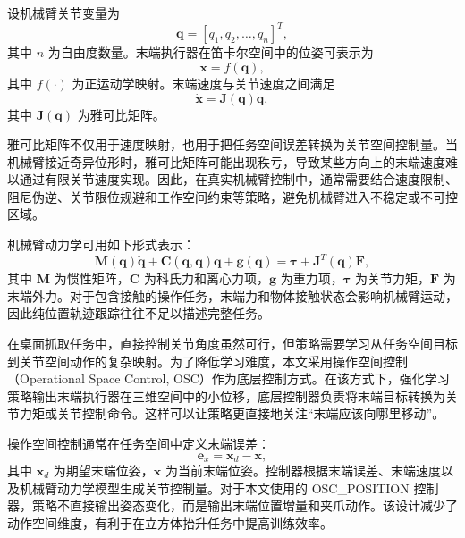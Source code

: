 \documentclass[
    type = bachelor,
    oneside,
    fontset = fandol
]{njuthesis}
\begin{document}
设机械臂关节变量为
\begin{equation}
  \boldsymbol{q} = [q_1, q_2, \dots, q_n]^T,
\end{equation}
其中 $n$ 为自由度数量。末端执行器在笛卡尔空间中的位姿可表示为
\begin{equation}
  \boldsymbol{x} = f(\boldsymbol{q}),
\end{equation}
其中 $f(\cdot)$ 为正运动学映射。末端速度与关节速度之间满足
\begin{equation}
  \dot{\boldsymbol{x}} = \boldsymbol{J}(\boldsymbol{q})\dot{\boldsymbol{q}},
\end{equation}
其中 $\boldsymbol{J}(\boldsymbol{q})$ 为雅可比矩阵。

雅可比矩阵不仅用于速度映射，也用于把任务空间误差转换为关节空间控制量。当机械臂接近奇异位形时，雅可比矩阵可能出现秩亏，导致某些方向上的末端速度难以通过有限关节速度实现。因此，在真实机械臂控制中，通常需要结合速度限制、阻尼伪逆、关节限位规避和工作空间约束等策略，避免机械臂进入不稳定或不可控区域。

机械臂动力学可用如下形式表示：
\begin{equation}
  \boldsymbol{M}(\boldsymbol{q})\ddot{\boldsymbol{q}}
  + \boldsymbol{C}(\boldsymbol{q},\dot{\boldsymbol{q}})\dot{\boldsymbol{q}}
  + \boldsymbol{g}(\boldsymbol{q})
  = \boldsymbol{\tau} + \boldsymbol{J}^T(\boldsymbol{q})\boldsymbol{F},
\end{equation}
其中 $\boldsymbol{M}$ 为惯性矩阵，$\boldsymbol{C}$ 为科氏力和离心力项，$\boldsymbol{g}$ 为重力项，$\boldsymbol{\tau}$ 为关节力矩，$\boldsymbol{F}$ 为末端外力。对于包含接触的操作任务，末端力和物体接触状态会影响机械臂运动，因此纯位置轨迹跟踪往往不足以描述完整任务。

在桌面抓取任务中，直接控制关节角度虽然可行，但策略需要学习从任务空间目标到关节空间动作的复杂映射。为了降低学习难度，本文采用操作空间控制（Operational Space Control, OSC）作为底层控制方式\cite{khatib1987osc}。在该方式下，强化学习策略输出末端执行器在三维空间中的小位移，底层控制器负责将末端目标转换为关节力矩或关节控制命令。这样可以让策略更直接地关注“末端应该向哪里移动”。

操作空间控制通常在任务空间中定义末端误差：
\begin{equation}
  \boldsymbol{e}_x = \boldsymbol{x}_{d} - \boldsymbol{x},
\end{equation}
其中 $\boldsymbol{x}_{d}$ 为期望末端位姿，$\boldsymbol{x}$ 为当前末端位姿。控制器根据末端误差、末端速度以及机械臂动力学模型生成关节控制量。对于本文使用的 OSC\_POSITION 控制器，策略不直接输出姿态变化，而是输出末端位置增量和夹爪动作。该设计减少了动作空间维度，有利于在立方体抬升任务中提高训练效率。
\end{document}

